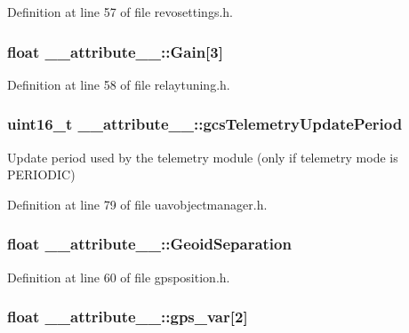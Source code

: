 \-Definition at line 57 of file revosettings.\-h.

\hypertarget{struct____attribute_____a648ad51312a270678ed70bc0d3d369a6}{
\subsubsection[{\-Gain}]{\setlength{\rightskip}{0pt plus 5cm}float {\bf \-\_\-\-\_\-attribute\-\_\-\-\_\-\-::\-Gain}\mbox{[}3\mbox{]}}}\label{struct____attribute_____a648ad51312a270678ed70bc0d3d369a6}


\-Definition at line 58 of file relaytuning.\-h.

\hypertarget{struct____attribute_____a6725d1b44961129705dbb1f209ba7b8d}{
\subsubsection[{gcs\-Telemetry\-Update\-Period}]{\setlength{\rightskip}{0pt plus 5cm}uint16\-\_\-t {\bf \-\_\-\-\_\-attribute\-\_\-\-\_\-\-::gcs\-Telemetry\-Update\-Period}}}\label{struct____attribute_____a6725d1b44961129705dbb1f209ba7b8d}
\-Update period used by the telemetry module (only if telemetry mode is \-P\-E\-R\-I\-O\-D\-I\-C) 

\-Definition at line 79 of file uavobjectmanager.\-h.

\hypertarget{struct____attribute_____a1b01d6f27599d171369372ef997520c9}{
\subsubsection[{\-Geoid\-Separation}]{\setlength{\rightskip}{0pt plus 5cm}float {\bf \-\_\-\-\_\-attribute\-\_\-\-\_\-\-::\-Geoid\-Separation}}}\label{struct____attribute_____a1b01d6f27599d171369372ef997520c9}


\-Definition at line 60 of file gpsposition.\-h.

\hypertarget{struct____attribute_____afe1df5cefaa9919447b3175a9711bd93}{
\subsubsection[{gps\-\_\-var}]{\setlength{\rightskip}{0pt plus 5cm}float {\bf \-\_\-\-\_\-attribute\-\_\-\-\_\-\-::gps\-\_\-var}\mbox{[}2\mbox{]}}}\label{struct____attribute_____afe1df5cefaa9919447b3175a9711bd93}


